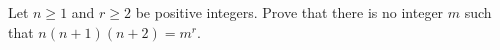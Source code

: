 Let $n \ge 1$ and $r \ge 2$ be positive integers. Prove that there is no
integer $m$ such that $n(n + 1)(n + 2) = m^r$.
